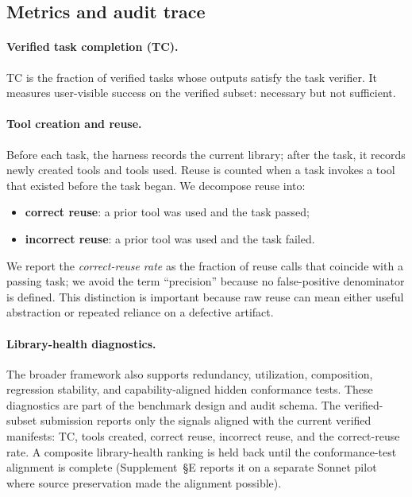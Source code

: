 \documentclass[sigconf,anonymous,natbib=false]{acmart}
\begin{document}
\subsection{Metrics and audit trace}

\paragraph{Verified task completion (TC).}
TC is the fraction of verified tasks whose outputs satisfy the task verifier. It measures user-visible success on the verified subset: necessary but not sufficient.

\paragraph{Tool creation and reuse.}
Before each task, the harness records the current library; after the task, it records newly created tools and tools used. Reuse is counted when a task invokes a tool that existed before the task began. We decompose reuse into:
\begin{itemize}[leftmargin=1.2em,noitemsep]
  \item \textbf{correct reuse}: a prior tool was used and the task passed;
  \item \textbf{incorrect reuse}: a prior tool was used and the task failed.
\end{itemize}
We report the \emph{correct-reuse rate} as the fraction of reuse calls that coincide with a passing task; we avoid the term ``precision'' because no false-positive denominator is defined. This distinction is important because raw reuse can mean either useful abstraction or repeated reliance on a defective artifact.

\paragraph{Library-health diagnostics.}
The broader framework also supports redundancy, utilization, composition, regression stability, and capability-aligned hidden conformance tests. These diagnostics are part of the benchmark design and audit schema. The verified-subset submission reports only the signals aligned with the current verified manifests: TC, tools created, correct reuse, incorrect reuse, and the correct-reuse rate. A composite library-health ranking is held back until the conformance-test alignment is complete (Supplement~\S E reports it on a separate Sonnet pilot where source preservation made the alignment possible).
\end{document}
